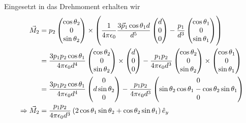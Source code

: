 \documentclass[a4paper,german,12pt,smallheadings]{scrartcl}
\begin{document}
\begin{enumerate}[a)]
    Eingesetzt in das Drehmoment erhalten wir
    \begin{align}
      \vec{M}_2 &= p_2 \begin{pmatrix}
        \cos \theta_2 \\
        0 \\
        \sin \theta_2
      \end{pmatrix}
      \times
      \del{
        \frac{1}{4 \pi \epsilon_0}
        \frac{3 \vec{p}_1 \cos \theta_1 d}{d^5} \begin{pmatrix} d \\ 0 \\ 0 \end{pmatrix} -
        \frac{p_1}{d^3} \begin{pmatrix} \cos \theta_1 \\ 0 \\ \sin \theta_1 \end{pmatrix}
      } \\
      &= \frac{3 p_1 p_2 \cos \theta_1}{4 \pi \epsilon_0 d^4}
        \begin{pmatrix} \cos \theta_2 \\ 0 \\ \sin \theta_2 \end{pmatrix} \times
        \begin{pmatrix} d \\ 0 \\ 0 \end{pmatrix}
        -
        \frac{p_1 p_2}{4 \pi \epsilon_0 d^3}
        \begin{pmatrix} \cos \theta_2 \\ 0 \\ \sin \theta_2 \end{pmatrix} \times
        \begin{pmatrix} \cos \theta_1 \\ 0 \\ \sin \theta_1 \end{pmatrix} \\
      &= \frac{3 p_1 p_2 \cos \theta_1}{4 \pi \epsilon_0 d^4}
         \begin{pmatrix} 0 \\ d \sin \theta_2 \\ 0 \end{pmatrix}
         - \frac{p_1 p_2}{4 \pi \epsilon_0 d^3}
           \begin{pmatrix}
             0 \\
             \sin \theta_2 \cos \theta_1 - \cos \theta_2 \sin \theta_1 \\
             0
           \end{pmatrix} \\
      \Rightarrow \vec{M}_{2} &= \frac{p_1p_2}{4 \pi \epsilon_0 d^3} \del{
        2 \cos \theta_1 \sin \theta_2 + \cos \theta_2 \sin \theta_1
      } \hat{e}_y
    \end{align}


\end{enumerate}
\end{document}
